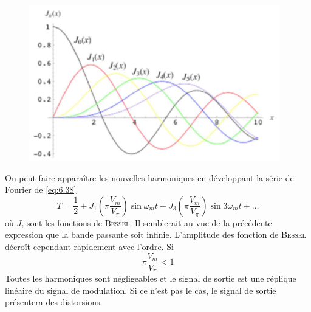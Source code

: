 	\begin{figure}
	\includegraphics[scale=0.4]{ch6/image6}
	\end{figure}
On peut faire apparaître les nouvelles harmoniques en développant la série de Fourier de \eqref{eq:6.38}
\begin{equation}
T = \frac{1}{2}+J_1\left(\pi\dfrac{V_m}{V_\pi}\right)\sin\omega_mt + J_3\left(\pi\dfrac{V_m}{V_\pi}\right)
\sin 3\omega_mt+ \dots
\end{equation}
où $J_i$ sont les fonctions de \textsc{Bessel}. Il semblerait au vue de la précédente expression que 
la bande passante soit infinie. L'amplitude des fonction de \textsc{Bessel} décroît cependant 
rapidement avec l'ordre. Si
\begin{equation}
\pi\dfrac{V_m}{V_\pi} <1
\end{equation}
Toutes les harmoniques sont négligeables et le signal de sortie est une réplique linéaire du signal de
modulation. Si ce n'est pas le cas, le signal de sortie présentera des distorsions.

\newpage
